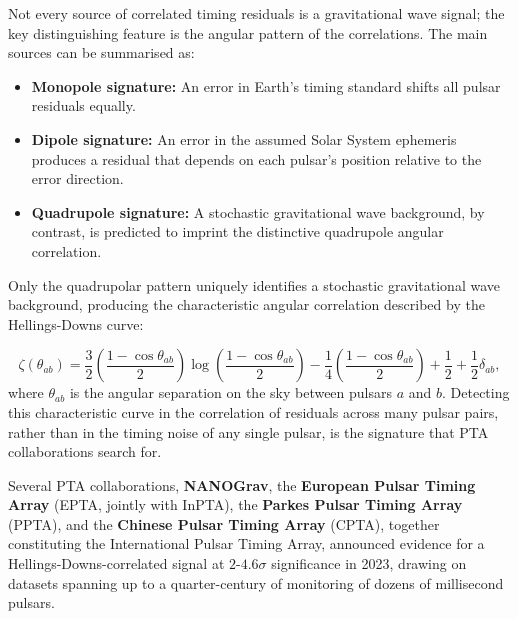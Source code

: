 \medskip

Not every source of correlated timing residuals is a gravitational wave signal; the key distinguishing feature is the angular pattern of the correlations. The main sources can be summarised as:
\begin{itemize}
    \item \textbf{Monopole signature:} An error in Earth's timing standard shifts all pulsar residuals equally.
    \item \textbf{Dipole signature:} An error in the assumed Solar System ephemeris produces a residual that depends on each pulsar's position relative to the error direction.
    \item \textbf{Quadrupole signature:} A stochastic gravitational wave background, by contrast, is predicted to imprint the distinctive quadrupole angular correlation.
\end{itemize}

Only the quadrupolar pattern uniquely identifies a stochastic gravitational wave background, producing the characteristic angular correlation described by the Hellings-Downs curve:

$$
\zeta(\theta_{ab}) = \frac{3}{2}\left(\frac{1-\cos\theta_{ab}}{2}\right)\log\!\left(\frac{1-\cos\theta_{ab}}{2}\right) - \frac{1}{4}\left(\frac{1-\cos\theta_{ab}}{2}\right) + \frac{1}{2} + \frac{1}{2}\delta_{ab} ,
$$
where $\theta_{ab}$ is the angular separation on the sky between pulsars $a$ and $b$. Detecting this characteristic curve in the correlation of residuals across many pulsar pairs, rather than in the timing noise of any single pulsar, is the signature that PTA collaborations search for.

\medskip

Several PTA collaborations, \textbf{NANOGrav}, the \textbf{European Pulsar Timing Array} (EPTA, jointly with InPTA), the \textbf{Parkes Pulsar Timing Array} (PPTA), and the \textbf{Chinese Pulsar Timing Array} (CPTA), together constituting the International Pulsar Timing Array, announced evidence for a Hellings-Downs-correlated signal at $2$-$4.6\sigma$ significance in 2023, drawing on datasets spanning up to a quarter-century of monitoring of dozens of millisecond pulsars.

\medskip

